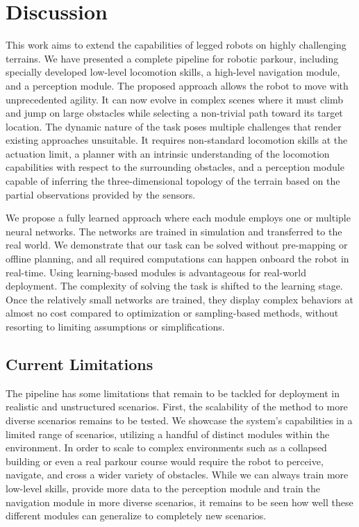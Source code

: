 \documentclass[conference]{IEEEtran}
\begin{document}
\section{Discussion}
This work aims to extend the capabilities of legged robots on highly challenging terrains. We have presented a complete pipeline for robotic parkour, including specially developed low-level locomotion skills, a high-level navigation module, and a perception module. The proposed approach allows the robot to move with unprecedented agility. It can now evolve in complex scenes where it must climb and jump on large obstacles while selecting a non-trivial path toward its target location. The dynamic nature of the task poses multiple challenges that render existing approaches unsuitable. It requires non-standard locomotion skills at the actuation limit, a planner with an intrinsic understanding of the locomotion capabilities with respect to the surrounding obstacles, and a perception module capable of inferring the three-dimensional topology of the terrain based on the partial observations provided by the sensors. 

We propose a fully learned approach where each module employs one or multiple neural networks. The networks are trained in simulation and transferred to the real world. We demonstrate that our task can be solved without pre-mapping or offline planning, and all required computations can happen onboard the robot in real-time.
Using learning-based modules is advantageous for real-world deployment. The complexity of solving the task is shifted to the learning stage. Once the relatively small networks are trained, they display complex behaviors at almost no cost compared to optimization or sampling-based methods, without resorting to limiting assumptions or simplifications.

\subsection{Current Limitations}
The pipeline has some limitations that remain to be tackled for deployment in realistic and unstructured scenarios. First, the scalability of the method to more diverse scenarios remains to be tested. We showcase the system's capabilities in a limited range of scenarios, utilizing a handful of distinct modules within the environment. In order to scale to complex environments such as a collapsed building or even a real parkour course would require the robot to perceive, navigate, and cross a wider variety of obstacles. While we can always train more low-level skills, provide more data to the perception module and train the navigation module in more diverse scenarios, it remains to be seen how well these different modules can generalize to completely new scenarios.
 
\end{document}
